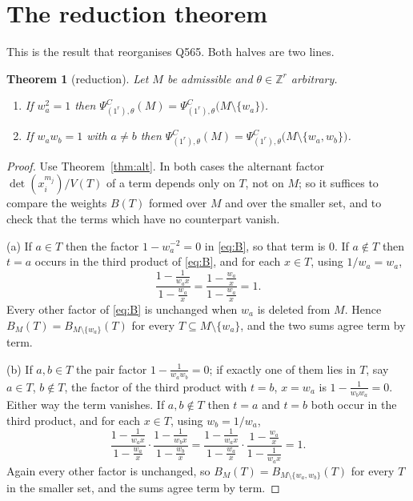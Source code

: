 \documentclass[11pt]{article}
\newtheorem{theorem}{Theorem}
\theoremstyle{definition}
\theoremstyle{remark}
\newcommand{\PsiC}{\Psi^{C}}
\begin{document}
\section{The reduction theorem}

This is the result that reorganises Q565. Both halves are two lines.

\begin{theorem}[reduction]\label{thm:red}
Let $M$ be admissible and $\theta\in\mathbb{Z}^r$ arbitrary.
\begin{enumerate}
\item[(a)] If $w_a^2=1$ then
  $\PsiC_{(1^r),\theta}(M)=\PsiC_{(1^r),\theta}\bigl(M\setminus\{w_a\}\bigr)$.
\item[(b)] If $w_aw_b=1$ with $a\ne b$ then
  $\PsiC_{(1^r),\theta}(M)=\PsiC_{(1^r),\theta}\bigl(M\setminus\{w_a,w_b\}\bigr)$.
\end{enumerate}
\end{theorem}

\begin{proof}
Use Theorem~\ref{thm:alt}. In both cases the alternant factor
$\det(x_i^{m_j})/V(T)$ of a term depends only on $T$, not on $M$; so it suffices
to compare the weights $B(T)$ formed over $M$ and over the smaller set, and to
check that the terms which have no counterpart vanish.

(a) If $a\in T$ then the factor $1-w_a^{-2}=0$ in \eqref{eq:B}, so that term is
$0$. If $a\notin T$ then $t=a$ occurs in the third product of \eqref{eq:B}, and
for each $x\in T$, using $1/w_a=w_a$,
\[
  \frac{1-\frac{1}{w_ax}}{1-\frac{w_a}{x}}
  =\frac{1-\frac{w_a}{x}}{1-\frac{w_a}{x}}=1 .
\]
Every other factor of \eqref{eq:B} is unchanged when $w_a$ is deleted from $M$.
Hence $B_M(T)=B_{M\setminus\{w_a\}}(T)$ for every $T\subseteq M\setminus\{w_a\}$,
and the two sums agree term by term.

(b) If $a,b\in T$ the pair factor $1-\frac{1}{w_aw_b}=0$; if exactly one of them
lies in $T$, say $a\in T$, $b\notin T$, the factor of the third product with
$t=b$, $x=w_a$ is $1-\frac{1}{w_bw_a}=0$. Either way the term vanishes. If
$a,b\notin T$ then $t=a$ and $t=b$ both occur in the third product, and for each
$x\in T$, using $w_b=1/w_a$,
\[
  \frac{1-\frac{1}{w_ax}}{1-\frac{w_a}{x}}\cdot
  \frac{1-\frac{1}{w_bx}}{1-\frac{w_b}{x}}
  =\frac{1-\frac{1}{w_ax}}{1-\frac{w_a}{x}}\cdot
   \frac{1-\frac{w_a}{x}}{1-\frac{1}{w_ax}}=1 .
\]
Again every other factor is unchanged, so $B_M(T)=B_{M\setminus\{w_a,w_b\}}(T)$
for every $T$ in the smaller set, and the sums agree term by term.
\end{proof}
\end{document}
